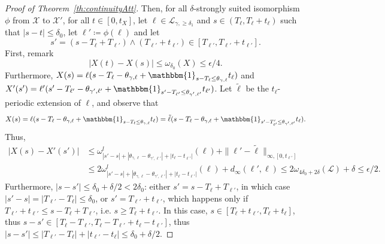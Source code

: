 \documentclass[11pt]{article}
\begin{document}
\begin{proof}[Proof of Theorem~\ref{th:continuityAtt}]
Then, for  all $\delta$-strongly suited isomorphism $\phi$ from $\mathcal{X}$ to $\mathcal{X}'$,
for all $t\in [0,t_X]$, let  $\ell \in \mathcal{L}_{\gamma,\geq \delta_1}$ and $s\in(T_\ell,T_\ell+t_\ell)$ such that $|s-t|\leq \delta_0$, let $\ell'\coloneqq \phi(\ell)$ and let
\[ s'=(s-T_\ell+T_{\ell'})\wedge (T_{\ell'}+t_{\ell'})\in [T_{\ell'},T_{\ell'}+ t_{\ell'}].\]
First, remark
\[|X(t)-X(s)|\leq \omega_{\delta_0}(X)\leq \epsilon/4.\]
Furthermore,  $X(s)={\ell}( s-T_\ell -\theta_{\gamma,\ell} +\mathbbm{1}_{ s-T_\ell\leq \theta_{\gamma,\ell}  } t_\ell
)$ and
$X'(s')=\ell'(s'- T_{\ell'} -\theta_{\gamma',\ell'}  +\mathbbm{1}_{ s'-T_{\ell'}\leq \theta_{\gamma',\ell'}  } t_{\ell'}   )  $.
Let  $\tilde{\ell}$ be the $t_\ell$-periodic extension of $\ell$, and observe that
\[
X(s)=\ell( s-T_\ell -\theta_{\gamma,\ell} +\mathbbm{1}_{ s-T_\ell\leq \theta_{\gamma,\ell}  } t_\ell
)=\tilde{\ell}( s-T_\ell -\theta_{\gamma,\ell} +\mathbbm{1}_{ s'-T'_{\ell'}\leq \theta_{\gamma',\ell'}  } t_\ell
).
\]
Thus,
\begin{align*}
|X(s)-X'(s')|
&\leq \omega^l_{ |s'-s| +|\theta_{\gamma,\ell}-\theta_{\gamma',\ell'}| +|t_\ell-t_{\ell'}| }(\ell)+\|\ell'-\tilde{\ell}\|_{\infty,[0,t_{\ell'}] }\\
&\leq 2 \omega^l_{ |s'-s|+|\theta_{\gamma,\ell}-\theta_{\gamma',\ell'}| +|t_\ell-t_{\ell'}| }(\ell)+d_\infty(\ell',\ell)\leq   2\omega_{4\delta_0+2\delta }(\mathcal{L}) +\delta\leq \epsilon/2.
\end{align*}
Furthermore, $|s-s'|\leq \delta_0+\delta/2<2\delta_0$:
either $s'=s-T_\ell+T_{\ell'}$, in which case $|s'-s|=| T_{\ell'}-T_\ell|\leq \delta_0 $, or
$s'=T_{\ell'}+t_{\ell'}$, which happens only if $T_{\ell'}+t_{\ell'}\leq s-T_\ell+T_{\ell'}$, i.e. $s\geq T_\ell+t_{\ell'}$. In this case, $s\in[T_\ell+t_{\ell'},T_\ell+t_{\ell}]$, thus $s-s'\in [T_{\ell}-T_{\ell'},T_{\ell}-T_{\ell'}+t_\ell-t_{\ell'}]$, thus $|s-s'|\leq | T_{\ell'}-T_\ell|+| t_{\ell'}-t_\ell|\leq \delta_0+\delta/2$.


\end{proof}
\end{document}
